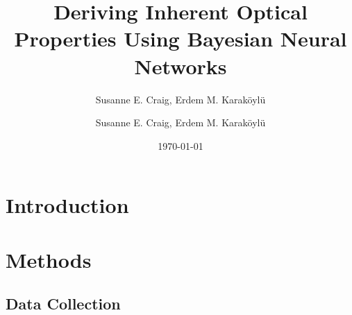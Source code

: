 \documentclass[10pt,a4paper]{article}
\author{Susanne E. Craig, Erdem M. Karaköylü}
\begin{document}
	\title{Deriving Inherent Optical Properties Using Bayesian Neural Networks}
	\author{Susanne E. Craig, Erdem M. Karaköylü}
	\date{\today}
	\maketitle
	\tableofcontents
	\newpage
	\section{Introduction}
	\newpage
	\section{Methods}
		\subsection{Data Collection}
\end{document}
